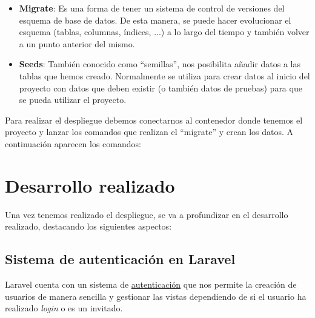 \documentclass{\ClassPath/viu-tfm-template}
\begin{document}
\vspace{-1em}
\begin{itemize}
    \item \textbf{Migrate}: Es una forma de tener un sistema de control de versiones del esquema de base de datos. De esta manera, se puede hacer evolucionar el esquema (tablas, columnas, índices, ...) a lo largo del tiempo y también volver a un punto anterior del mismo.
    \item \textbf{Seeds}: También conocido como “semillas”, nos posibilita añadir datos a las tablas que hemos creado. Normalmente se utiliza para crear datos al inicio del proyecto con datos que deben existir (o también datos de pruebas) para que se pueda utilizar el proyecto.
\end{itemize}
\vspace{-1em}

Para realizar el despliegue debemos conectarnos al contenedor donde tenemos el proyecto y lanzar los comandos que realizan el “migrate” y crean los datos. A continuación aparecen los comandos:




\chapter{Desarrollo realizado}

Una vez tenemos realizado el despliegue, se va a profundizar en el desarrollo realizado, destacando los siguientes aspectos:

\section{Sistema de autenticación en Laravel}
Laravel cuenta con un sistema de \href{https://laravel.com/docs/6.x/authentication}{autenticación} que nos permite la creación de usuarios de manera sencilla y gestionar las vistas dependiendo de si el usuario ha realizado \textit{login} o es un invitado.
\end{document}
